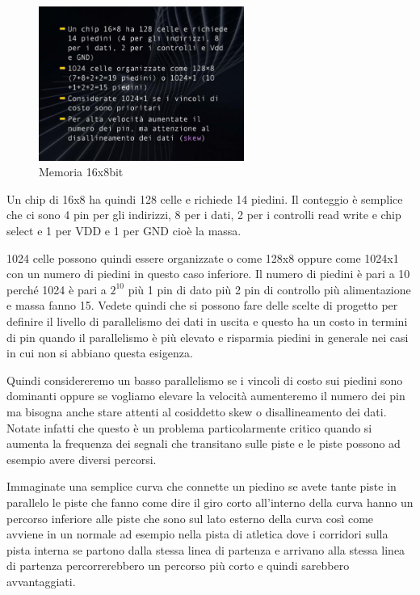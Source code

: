 \FloatBarrier
\begin{figure}[H]
  \centering
  \includegraphics[width=0.60\textwidth,
                    trim=40 40 10 40, %
                    clip]
                    {images/Lez04_p02_fig_03.png}
  \caption{Memoria 16x8bit}
  \label{fig:Lez04_p02_fig_03}
\end{figure}
\FloatBarrier
\noindent

Un chip di 16x8 ha quindi 128 celle e richiede 14 piedini.
Il conteggio è semplice che ci sono 4 pin per gli indirizzi, 8 per i dati, 2 per i controlli read write e chip select e 1 per VDD e 1 per GND cioè la massa.

1024 celle possono quindi essere organizzate o come 128x8 oppure come 1024x1 con un numero di piedini in questo caso inferiore.
Il numero di piedini è pari a 10 perché 1024 è pari a $2^10$ più 1 pin di dato più 2 pin di controllo più alimentazione e massa fanno 15.
Vedete quindi che si possono fare delle scelte di progetto per definire il livello di parallelismo dei dati in uscita e questo ha un costo in termini di pin quando il parallelismo è più elevato e risparmia piedini in generale nei casi in cui non si abbiano questa esigenza.

Quindi considereremo un basso parallelismo se i vincoli di costo sui piedini sono dominanti oppure se vogliamo elevare la velocità aumenteremo il numero dei pin ma bisogna anche stare attenti al cosiddetto skew o disallineamento dei dati.
Notate infatti che questo è un problema particolarmente critico quando si aumenta la frequenza dei segnali che transitano sulle piste e le piste possono ad esempio avere diversi percorsi.

Immaginate una semplice curva che connette un piedino se avete tante piste in parallelo le piste che fanno come dire il giro corto all'interno della curva hanno un percorso inferiore alle piste che sono sul lato esterno della curva così come avviene in un normale ad esempio nella pista di atletica dove i corridori sulla pista interna se partono dalla stessa linea di partenza e arrivano alla stessa linea di partenza percorrerebbero un percorso più corto e quindi sarebbero avvantaggiati.

